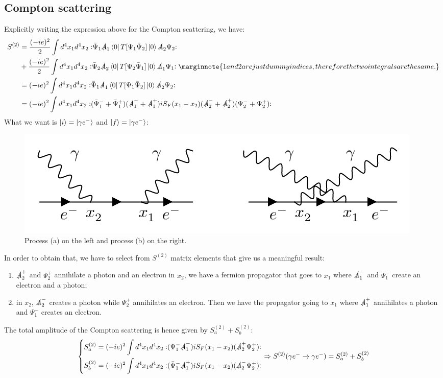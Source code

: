 \documentclass[../main.tex]{subfiles}
\begin{document}
\subsection{Compton scattering}
Explicitly writing the expression above for the Compton scattering, we have:
\begin{align*}
S^{(2)}&=\frac{(-ie)^2}{2}\int d^4x_1d^4x_2\norder{\bar{\Psi}_1\slashed{A}_1\bra{0}T[\Psi_1\bar{\Psi}_2]\ket{0}\slashed{A}_2\Psi_2}\\
&+\frac{(-ie)^2}{2}\int d^4x_1d^4x_2\norder{\bar{\Psi}_2\slashed{A}_2\bra{0}T[\Psi_2\bar{\Psi}_1]\ket{0}\slashed{A}_1\Psi_1}\marginnote{1 and 2 are just dummy indices, therefore the two integrals are the same.}\\
&=(-ie)^2\int d^4x_1d^4x_2\norder{\bar{\Psi}_1\slashed{A}_1\bra{0}T[\Psi_1\bar{\Psi}_2]\ket{0}\slashed{A}_2\Psi_2}\\
&=(-ie)^2\int d^4x_1d^4x_2\norder{(\bar{\Psi}_1^-+\bar{\Psi}_1^+)(\slashed{A}_1^-+\slashed{A}_1^+)iS_F(x_1-x_2)(\slashed{A}_2^-+\slashed{A}_2^+)(\Psi_2^-+\Psi_2^+)}
\end{align*}
What we want is $\ket{i}=\ket{\gamma e^-}$ and $\ket{f}=\ket{\gamma e^-}$:
\begin{figure}[h!]
    \centering
    \includegraphics{Images/compton.png}
    \caption{Process (a) on the left and process (b) on the right.}
\end{figure}

In order to obtain that, we have to select from $S^{(2)}$ matrix elements that give us a meaningful result:
\begin{enumerate}[label=\alph*)]
    \item $\slashed{A}^+_2$ and $\Psi^+_2$ annihilate a photon and an electron in $x_2$, we have a fermion propagator that goes to $x_1$ where $\slashed{A}^-_1$ and $\Psi^-_1$ create an electron and a photon;
    \item in $x_2$, $\slashed{A}^-_2$ creates a photon while $\Psi^+_2$ annihilates an electron. Then we have the propagator going to $x_1$ where $\slashed{A}^+_1$ annihilates a photon and $\Psi^-_1$ creates an electron.
\end{enumerate}
The total amplitude of the Compton scattering is hence given by $S^{(2)}_a+S^{(2)}_b$:
\[
\left\{
\begin{aligned}
S_a^{(2)}&=(-ie)^2\int d^4x_1d^4x_2\vcentcolon\mathrel{(\bar{\Psi}_1^-\slashed{A}_1^-)iS_F(x_1-x_2)(\slashed{A}_2^+\Psi_2^+)}\vcentcolon\\
S_b^{(2)}&=(-ie)^2\int d^4x_1d^4x_2\vcentcolon\mathrel{(\bar{\Psi}_1^-\slashed{A}_1^+)iS_F(x_1-x_2)(\slashed{A}_2^-\Psi_2^+)}\vcentcolon
\end{aligned}
\right.
\Rightarrow S^{(2)}(\gamma e^-\xrightarrow[]{}\gamma e^-)=S_a^{(2)}+S_b^{(2)}
\]
\end{document}
